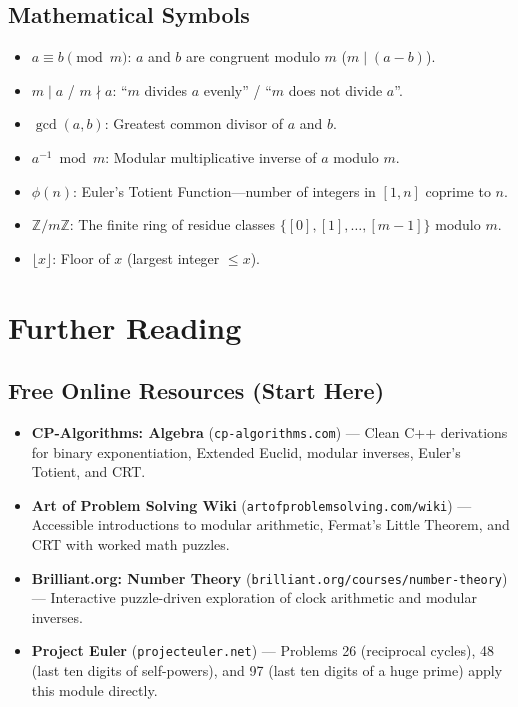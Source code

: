\documentclass[11pt,a4paper]{article}
\theoremstyle{definition}
\begin{document}
\subsection*{Mathematical Symbols}
\begin{itemize}
    \item $a \equiv b \pmod m$: $a$ and $b$ are congruent modulo $m$ ($m \mid (a - b)$).
    \item $m \mid a$ / $m \nmid a$: ``$m$ divides $a$ evenly'' / ``$m$ does not divide $a$''.
    \item $\gcd(a, b)$: Greatest common divisor of $a$ and $b$.
    \item $a^{-1} \bmod m$: Modular multiplicative inverse of $a$ modulo $m$.
    \item $\phi(n)$: Euler's Totient Function---number of integers in $[1, n]$ coprime to $n$.
    \item $\mathbb{Z}/m\mathbb{Z}$: The finite ring of residue classes $\{[0], [1], \dots, [m - 1]\}$ modulo $m$.
    \item $\lfloor x \rfloor$: Floor of $x$ (largest integer $\le x$).
\end{itemize}

\section{Further Reading}

\subsection*{Free Online Resources (Start Here)}
\begin{itemize}
    \item \textbf{CP-Algorithms: Algebra} (\texttt{cp-algorithms.com}) --- Clean C++ derivations for binary exponentiation, Extended Euclid, modular inverses, Euler's Totient, and CRT.
    \item \textbf{Art of Problem Solving Wiki} (\texttt{artofproblemsolving.com/wiki}) --- Accessible introductions to modular arithmetic, Fermat's Little Theorem, and CRT with worked math puzzles.
    \item \textbf{Brilliant.org: Number Theory} (\texttt{brilliant.org/courses/number-theory}) --- Interactive puzzle-driven exploration of clock arithmetic and modular inverses.
    \item \textbf{Project Euler} (\texttt{projecteuler.net}) --- Problems 26 (reciprocal cycles), 48 (last ten digits of self-powers), and 97 (last ten digits of a huge prime) apply this module directly.
\end{itemize}
\end{document}
